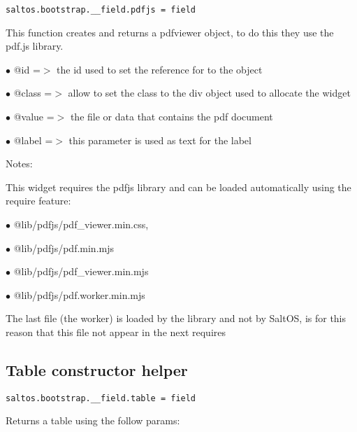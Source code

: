 \documentclass[a4paper]{book}
\begin{document}
\begin{lstlisting}
saltos.bootstrap.__field.pdfjs = field
\end{lstlisting}

This function creates and returns a pdfviewer object, to do this they use the pdf.js library.

\begin{compactitem}
\item[\color{myblue}$\bullet$] @id    =$>$ the id used to set the reference for to the object
\item[\color{myblue}$\bullet$] @class =$>$ allow to set the class to the div object used to allocate the widget
\item[\color{myblue}$\bullet$] @value =$>$ the file or data that contains the pdf document
\item[\color{myblue}$\bullet$] @label =$>$ this parameter is used as text for the label
\end{compactitem}

Notes:

This widget requires the pdfjs library and can be loaded automatically using the require
feature:

\begin{compactitem}
\item[\color{myblue}$\bullet$] @lib/pdfjs/pdf\_viewer.min.css,
\item[\color{myblue}$\bullet$] @lib/pdfjs/pdf.min.mjs
\item[\color{myblue}$\bullet$] @lib/pdfjs/pdf\_viewer.min.mjs
\item[\color{myblue}$\bullet$] @lib/pdfjs/pdf.worker.min.mjs
\end{compactitem}

The last file (the worker) is loaded by the library and not by SaltOS, is for this reason
that this file not appear in the next requires

\hypertarget{toc459}{}
\subsection{Table constructor helper}

\begin{lstlisting}
saltos.bootstrap.__field.table = field
\end{lstlisting}

Returns a table using the follow params:
\end{document}
